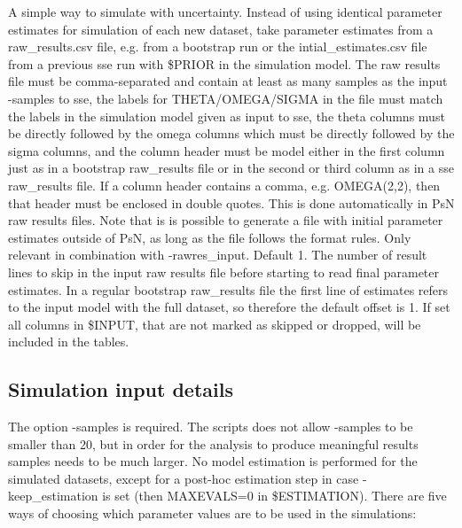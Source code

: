 \begin{optionlist}
A simple way to simulate with uncertainty. Instead of using identical parameter estimates for simulation of each new dataset, take parameter estimates from a raw\_results.csv file, e.g. from a bootstrap run or the intial\_estimates.csv file from a previous sse run with \$PRIOR in the simulation model. The raw results file must be comma-separated and contain at least as many samples as the input -samples to sse, the labels for THETA/OMEGA/SIGMA in the file must match the labels in the simulation model given as input to sse, the theta columns must be directly followed by the omega columns which must be directly followed by the sigma columns, and the column header must be model either in the first column just as in a bootstrap raw\_results file or in the second or third column as in a sse raw\_results file. If a column header contains a comma, e.g. OMEGA(2,2), then that header must be enclosed in double quotes. This is done automatically in PsN raw results files. Note that is is possible to generate a file with initial parameter estimates outside of PsN, as long as the file follows the format rules. 
\nextopt
{}
Only relevant in combination with -rawres\_input. Default 1. The number of result lines to skip in the input raw results file before starting to read final parameter estimates. In a regular bootstrap raw\_results file the first line of estimates refers to the input model with the full dataset, so therefore the default offset is 1. 
\nextopt
{}
If set all columns in \$INPUT, that are not marked as skipped or dropped, will be included in the tables.
\nextopt
\end{optionlist}



\subsection{Simulation input details}
The option -samples is required. The scripts does not allow -samples to be smaller than 20, but in order for the analysis to produce meaningful results samples needs to be much larger. No model estimation is performed for the simulated datasets, except for a post-hoc estimation step in case -keep\_estimation is set (then MAXEVALS=0 in \$ESTIMATION). There are five ways of choosing which parameter values are to be used in the simulations: 

